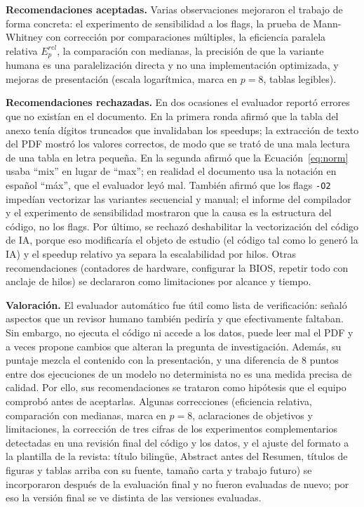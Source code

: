 \documentclass[12pt]{article}
\begin{document}
\textbf{Recomendaciones aceptadas.} Varias observaciones mejoraron el trabajo de forma concreta: el experimento de sensibilidad a los flags, la prueba de Mann-Whitney con corrección por comparaciones múltiples, la eficiencia paralela relativa $E^{rel}_p$, la comparación con medianas, la precisión de que la variante humana es una paralelización directa y no una implementación optimizada, y mejoras de presentación (escala logarítmica, marca en $p = 8$, tablas legibles).

\textbf{Recomendaciones rechazadas.} En dos ocasiones el evaluador reportó errores que no existían en el documento. En la primera ronda afirmó que la tabla del anexo tenía dígitos truncados que invalidaban los speedups; la extracción de texto del PDF mostró los valores correctos, de modo que se trató de una mala lectura de una tabla en letra pequeña. En la segunda afirmó que la Ecuación~\ref{eq:norm} usaba ``mix'' en lugar de ``max''; en realidad el documento usa la notación en español ``máx'', que el evaluador leyó mal. También afirmó que los flags \texttt{-O2} impedían vectorizar las variantes secuencial y manual; el informe del compilador y el experimento de sensibilidad mostraron que la causa es la estructura del código, no los flags. Por último, se rechazó deshabilitar la vectorización del código de IA, porque eso modificaría el objeto de estudio (el código tal como lo generó la IA) y el speedup relativo ya separa la escalabilidad por hilos. Otras recomendaciones (contadores de hardware, configurar la BIOS, repetir todo con anclaje de hilos) se declararon como limitaciones por alcance y tiempo.

\textbf{Valoración.} El evaluador automático fue útil como lista de verificación: señaló aspectos que un revisor humano también pediría y que efectivamente faltaban. Sin embargo, no ejecuta el código ni accede a los datos, puede leer mal el PDF y a veces propone cambios que alteran la pregunta de investigación. Además, su puntaje mezcla el contenido con la presentación, y una diferencia de 8 puntos entre dos ejecuciones de un modelo no determinista no es una medida precisa de calidad. Por ello, sus recomendaciones se trataron como hipótesis que el equipo comprobó antes de aceptarlas. Algunas correcciones (eficiencia relativa, comparación con medianas, marca en $p = 8$, aclaraciones de objetivos y limitaciones, la corrección de tres cifras de los experimentos complementarios detectadas en una revisión final del código y los datos, y el ajuste del formato a la plantilla de la revista: título bilingüe, Abstract antes del Resumen, títulos de figuras y tablas arriba con su fuente, tamaño carta y trabajo futuro) se incorporaron después de la evaluación final y no fueron evaluadas de nuevo; por eso la versión final se ve distinta de las versiones evaluadas.
\end{document}
